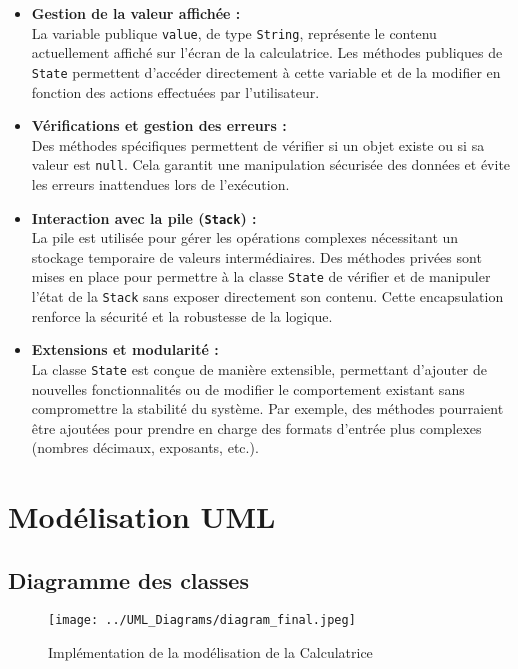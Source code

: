 \documentclass[12pt, a4paper, onecolumn]{article}
\begin{document}
\begin{itemize}
\item \textbf{Gestion de la valeur affichée :} \\
La variable publique \texttt{value}, de type \texttt{String}, représente le contenu actuellement affiché sur l'écran de la calculatrice. Les méthodes publiques de \texttt{State} permettent d'accéder directement à cette variable et de la modifier en fonction des actions effectuées par l'utilisateur.

\item \textbf{Vérifications et gestion des erreurs :} \\
Des méthodes spécifiques permettent de vérifier si un objet existe ou si sa valeur est \texttt{null}. Cela garantit une manipulation sécurisée des données et évite les erreurs inattendues lors de l'exécution.

\item \textbf{Interaction avec la pile (\texttt{Stack}) :} \\
La pile est utilisée pour gérer les opérations complexes nécessitant un stockage temporaire de valeurs intermédiaires. Des méthodes privées sont mises en place pour permettre à la classe \texttt{State} de vérifier et de manipuler l'état de la \texttt{Stack} sans exposer directement son contenu. Cette encapsulation renforce la sécurité et la robustesse de la logique.

\item \textbf{Extensions et modularité :} \\
La classe \texttt{State} est conçue de manière extensible, permettant d'ajouter de nouvelles fonctionnalités ou de modifier le comportement existant sans compromettre la stabilité du système. Par exemple, des méthodes pourraient être ajoutées pour prendre en charge des formats d'entrée plus complexes (nombres décimaux, exposants, etc.).
\end{itemize}


	
\section{Modélisation UML}
\subsection{Diagramme des classes}
\begin{figure}[H]
	\centering
	\texttt{[image: ../UML\_Diagrams/diagram\_final.jpeg]}
	\caption{Implémentation de la modélisation de la Calculatrice}
\end{figure}
\end{document}
